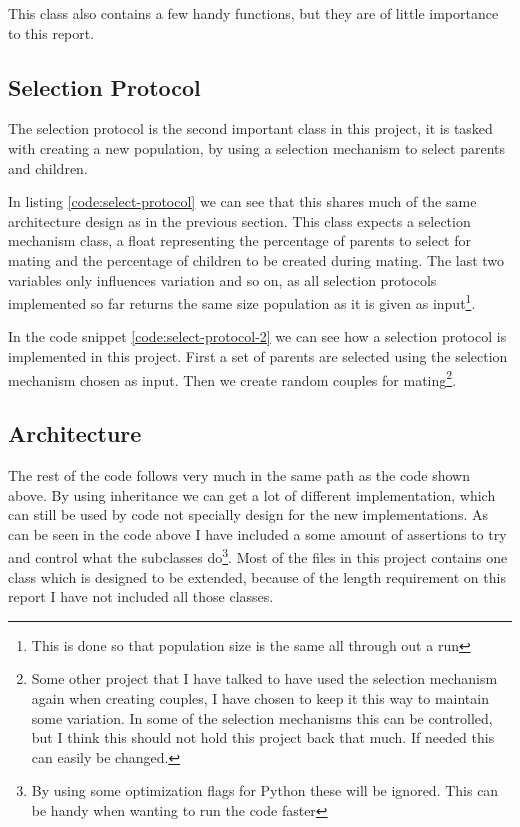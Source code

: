 This class also contains a few handy functions, but they are of little
importance to this report.

\subsection{Selection Protocol}\label{sec:selection protocol}
The selection protocol is the second important class in this project, it is
tasked with creating a new population, by using a selection mechanism to select
parents and children.



In listing \ref{code:select-protocol} we can see that this shares much of the
same architecture design as in the previous section. This class expects a
selection mechanism class, a float representing the percentage of parents to
select for mating and the percentage of children to be created during mating.
The last two variables only influences variation and so on, as all selection
protocols implemented so far returns the same size population as it is given as
input\footnote{This is done so that population size is the same all through out
a run}.



In the code snippet \ref{code:select-protocol-2} we can see how a selection
protocol is implemented in this project. First a set of parents are selected
using the selection mechanism chosen as input. Then we create random couples for
mating\footnote{Some other project that I have talked to have used the selection
	mechanism again when creating couples, I have chosen to keep it this way
	to maintain some variation. In some of the selection mechanisms this can
	be controlled, but I think this should not hold this project back that
much. If needed this can easily be changed.}.

\subsection{Architecture}\label{sec:architecture}
The rest of the code follows very much in the same path as the code shown above.
By using inheritance we can get a lot of different implementation, which can
still be used by code not specially design for the new implementations. As can
be seen in the code above I have included a some amount of assertions to try and
control what the subclasses do\footnote{By using some optimization flags for
	Python these will be ignored. This can be handy when wanting to run the
code faster}. Most of the files in this project contains one class which is
designed to be extended, because of the length requirement on this report
I have not included all those classes.

